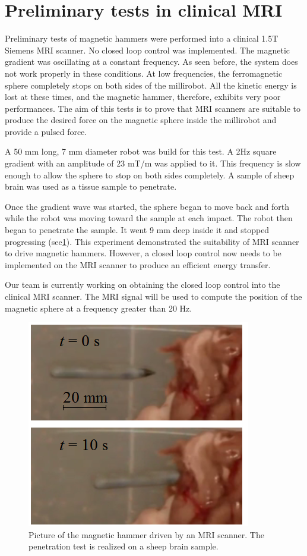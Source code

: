 \documentclass[letterpaper, 10 pt, conference]{ieeeconf}  %
\begin{document}
\section{Preliminary tests in clinical MRI}
\label{MRI_tests}
Preliminary tests of magnetic hammers were performed into a clinical 1.5T Siemens MRI scanner. No closed loop control was implemented. The magnetic gradient was oscillating at a constant frequency. As seen before, the system does not work properly in these conditions. At low frequencies, the ferromagnetic sphere completely stops on both sides of the millirobot. All the kinetic energy is lost at these times, and the magnetic hammer, therefore, exhibits very poor performances. The aim of this tests is to prove that MRI scanners are suitable to produce the desired force on the magnetic sphere inside the millirobot and provide a pulsed force.\par
A 50 mm long, 7 mm diameter robot was build for this test. A 2Hz square gradient with an amplitude of 23 mT/m was applied to it. This frequency is slow enough to allow the sphere to stop on both sides completely. A sample of sheep brain was used as a tissue sample to penetrate.\par
Once the gradient wave was started, the sphere began to move back and forth while the robot was moving toward the sample at each impact. The robot then began to penetrate the sample. It went 9 mm deep inside it and stopped progressing (see\cref{MRI_test}). 
This experiment demonstrated the suitability of MRI scanner to drive magnetic hammers. However, a closed loop control now needs to be implemented on the MRI scanner to produce an efficient energy transfer. \par
Our team is currently working on obtaining the closed loop control into the clinical MRI scanner. The MRI signal will be used to compute the position of the magnetic sphere at a frequency greater than 20 Hz.

\begin{figure}
\centering
  \includegraphics[width=150 pt]{tests_in_MRI.png}
  \caption{Picture of the magnetic hammer driven by an MRI scanner. The penetration test is realized on a sheep brain sample.}
  \label{MRI_test}
\end{figure}
\end{document}
